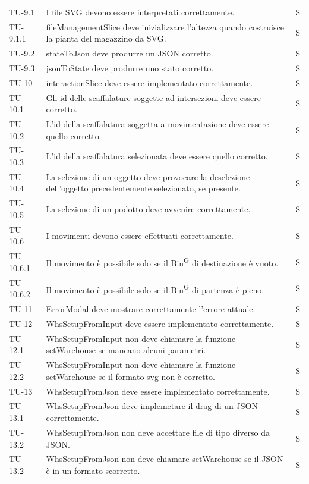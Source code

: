 \begin{xltabular}{0.9\textwidth}{X | p{0.6\textwidth} | p{0.1\textwidth} }
    TU-9.1 & I file SVG devono essere interpretati correttamente. & S\\
    TU-9.1.1 & fileManagementSlice deve inizializzare l'altezza quando costruisce la pianta del magazzino da SVG. & S\\
    TU-9.2 & stateToJson deve produrre un JSON corretto. &S\\
    TU-9.3 & jsonToState deve produrre uno stato corretto. & S\\
    TU-10 &interactionSlice deve essere implementato correttamente. & S\\
    TU-10.1 & Gli id delle scaffalature soggette ad intersezioni deve essere corretto. & S\\
    TU-10.2 & L'id della scaffalatura soggetta a movimentazione deve essere quello corretto. & S\\
    TU-10.3 & L'id della scaffalatura selezionata deve essere quello corretto. & S\\
    TU-10.4 & La selezione di un oggetto deve provocare la deselezione dell'oggetto precedentemente selezionato, se presente. & S\\
    TU-10.5 & La selezione di un podotto deve avvenire correttamente. & S\\
    TU-10.6 & I movimenti devono essere effettuati correttamente. & S\\
    TU-10.6.1 & Il movimento è possibile solo se il Bin\textsuperscript{G} di destinazione è vuoto. & S\\
    TU-10.6.2 & Il movimento è possibile solo se il Bin\textsuperscript{G} di partenza è pieno. &S\\ 
    TU-11 & ErrorModal deve mostrare correttamente l'errore attuale. & S\\
    TU-12 & WhsSetupFromInput deve essere implementato correttamente. & S\\
    TU-12.1 & WhsSetupFromInput non deve chiamare la funzione setWarehouse se mancano alcuni parametri. & S\\ 
    TU-12.2 & WhsSetupFromInput non deve chiamare la funzione setWarehouse se il formato svg non è corretto. & S\\ 
    TU-13 & WhsSetupFromJson deve essere implementato correttamente. & S\\
    TU-13.1 & WhsSetupFromJson deve implemetare il drag di un JSON correttamente. & S\\
    TU-13.2 & WhsSetupFromJson non deve accettare file di tipo diverso da JSON. & S\\
    TU-13.2 & WhsSetupFromJson non deve chiamare setWarehouse se il JSON è in un formato scorretto. & S\\

\end{xltabular}
